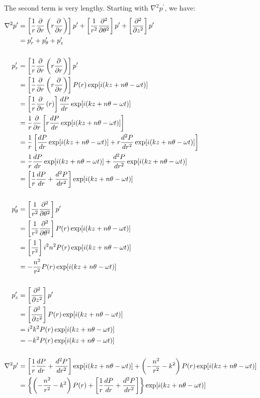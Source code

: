 \documentclass[onecolumn,10pt]{jhwhw}
\begin{document}
The second term is very lengthy. Starting with $\nabla^2 p^{\prime}$, we have:
\begin{align*}
\nabla^2 p^{\prime} &= \left [ \dfrac{1}{r} \dfrac{\partial}{\partial r} \left ( r \dfrac{\partial} {\partial r} \right ) \right ] p^{\prime}
+ \left [ \dfrac{1}{r^2} \dfrac{\partial ^2}{\partial \theta^2} \right ] p^{\prime}
+ \left [ \dfrac{\partial ^2}{\partial z^2} \right ] p^{\prime} \\
&= p^{\prime}_r + p^{\prime}_{\theta} + p^{\prime}_z \\
\\
p^{\prime}_r  &= \left [ \dfrac{1}{r} \dfrac{\partial}{\partial r} \left ( r \dfrac{\partial} {\partial r} \right ) \right ] p^{\prime} \\
&= \left [ \dfrac{1}{r} \dfrac{\partial}{\partial r} \left ( r \dfrac{\partial} {\partial r} \right ) \right ] P(r) \exp[i(kz+n \theta - \omega t)] \\
&= \left [ \dfrac{1}{r} \dfrac{\partial}{\partial r} \left ( r \right ) \right ] \dfrac{d P} {d r} \exp[i(kz+n \theta - \omega t)] \\
&= \dfrac{1}{r} \dfrac{\partial}{\partial r} \left [ r \dfrac{d P} {d r} \exp[i(kz+n \theta - \omega t)]  \right ] \\
&= \dfrac{1}{r} \left [ \dfrac{d P} {d r} \exp[i(kz+n \theta - \omega t)] + r \dfrac{d^2 P} {d r^2} \exp[i(kz+n \theta - \omega t)]  \right ] \\
&= \dfrac{1}{r} \dfrac{d P} {d r} \exp[i(kz+n \theta - \omega t)] + \dfrac{d^2 P} {d r^2} \exp[i(kz+n \theta - \omega t)] \\
&= \left [ \dfrac{1}{r} \dfrac{d P} {d r} + \dfrac{d^2 P} {d r^2} \right ] \exp[i(kz+n \theta - \omega t)] \\
\\
p^{\prime}_{\theta} &= \left [ \dfrac{1}{r^2} \dfrac{\partial ^2}{\partial \theta^2} \right ] p^{\prime} \\
&= \left [ \dfrac{1}{r^2} \dfrac{\partial ^2}{\partial \theta^2} \right ] P(r) \exp[i(kz+n \theta - \omega t)] \\
&= \left [ \dfrac{1}{r^2} \right ] i^2 n^2 P(r) \exp[i(kz+n \theta - \omega t)] \\
&= - \dfrac{n^2}{r^2}  P(r) \exp[i(kz+n \theta - \omega t)] \\
\\
p^{\prime}_z &= \left [ \dfrac{\partial ^2}{\partial z^2} \right ] p^{\prime} \\
&= \left [ \dfrac{\partial ^2}{\partial z^2} \right ] P(r) \exp[i(kz+n \theta - \omega t)] \\
&= i^2k^2 P(r) \exp[i(kz+n \theta - \omega t)] \\
&= -k^2 P(r) \exp[i(kz+n \theta - \omega t)] \\
\\
\nabla^2 p^{\prime} &= \left [ \dfrac{1}{r} \dfrac{d P} {d r} + \dfrac{d^2 P} {d r^2} \right ] \exp[i(kz+n \theta - \omega t)] + \left ( -\dfrac{n^2}{r^2} -k^2 \right ) P(r) \exp[i(kz+n \theta - \omega t)] \\
&= \left \{ \left ( -\dfrac{n^2}{r^2} -k^2 \right ) P(r) + \left [ \dfrac{1}{r} \dfrac{d P} {d r} + \dfrac{d^2 P} {d r^2} \right ] \right \} \exp[i(kz+n \theta - \omega t)]
\end{align*}
\end{document}
